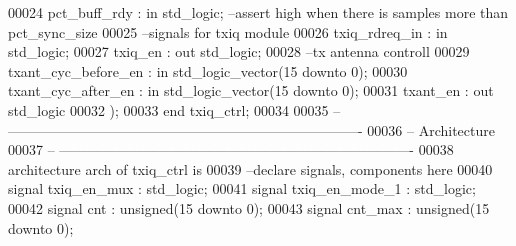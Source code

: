 \begin{DoxyCode}
00024       \textcolor{vhdlchar}{pct_buff_rdy}        \textcolor{vhdlchar}{:} \textcolor{keywordflow}{in} \textcolor{comment}{std\_logic};\textcolor{keyword}{ --assert high when there is samples more than pct\_sync\_size}
00025 \textcolor{keyword}{      --signals for txiq module}
00026       \textcolor{vhdlchar}{txiq_rdreq_in}       \textcolor{vhdlchar}{:} \textcolor{keywordflow}{in} \textcolor{comment}{std\_logic};
00027       \textcolor{vhdlchar}{txiq_en}             \textcolor{vhdlchar}{:} \textcolor{keywordflow}{out} \textcolor{comment}{std\_logic};
00028 \textcolor{keyword}{      --tx antenna controll}
00029       \textcolor{vhdlchar}{txant_cyc_before_en} \textcolor{vhdlchar}{:} \textcolor{keywordflow}{in} \textcolor{comment}{std\_logic\_vector}\textcolor{vhdlchar}{(}\textcolor{vhdllogic}{}\textcolor{vhdllogic}{15} \textcolor{keywordflow}{downto} \textcolor{vhdllogic}{}\textcolor{vhdllogic}{0}\textcolor{vhdlchar}{)};
00030       \textcolor{vhdlchar}{txant_cyc_after_en}  \textcolor{vhdlchar}{:} \textcolor{keywordflow}{in} \textcolor{comment}{std\_logic\_vector}\textcolor{vhdlchar}{(}\textcolor{vhdllogic}{}\textcolor{vhdllogic}{15} \textcolor{keywordflow}{downto} \textcolor{vhdllogic}{}\textcolor{vhdllogic}{0}\textcolor{vhdlchar}{)};
00031       \textcolor{vhdlchar}{txant_en}            \textcolor{vhdlchar}{:} \textcolor{keywordflow}{out} \textcolor{comment}{std\_logic}
00032         \textcolor{vhdlchar}{)};
00033 \textcolor{keywordflow}{end} \textcolor{vhdlchar}{txiq\_ctrl};
00034 
00035 \textcolor{keyword}{-- ----------------------------------------------------------------------------}
00036 \textcolor{keyword}{-- Architecture}
00037 \textcolor{keyword}{-- ----------------------------------------------------------------------------}
00038 \textcolor{keywordflow}{architecture} arch \textcolor{keywordflow}{of} txiq_ctrl is
00039 \textcolor{keyword}{--declare signals,  components here}
00040 \textcolor{keywordflow}{signal} \textcolor{vhdlchar}{txiq_en_mux}         \textcolor{vhdlchar}{:} \textcolor{comment}{std\_logic};
00041 \textcolor{keywordflow}{signal} \textcolor{vhdlchar}{txiq_en_mode_1}      \textcolor{vhdlchar}{:} \textcolor{comment}{std\_logic};
00042 \textcolor{keywordflow}{signal} \textcolor{vhdlchar}{cnt}                 \textcolor{vhdlchar}{:} \textcolor{comment}{unsigned}\textcolor{vhdlchar}{(}\textcolor{vhdllogic}{}\textcolor{vhdllogic}{15} \textcolor{keywordflow}{downto} \textcolor{vhdllogic}{}\textcolor{vhdllogic}{0}\textcolor{vhdlchar}{)};
00043 \textcolor{keywordflow}{signal} \textcolor{vhdlchar}{cnt_max}             \textcolor{vhdlchar}{:} \textcolor{comment}{unsigned}\textcolor{vhdlchar}{(}\textcolor{vhdllogic}{}\textcolor{vhdllogic}{15} \textcolor{keywordflow}{downto} \textcolor{vhdllogic}{}\textcolor{vhdllogic}{0}\textcolor{vhdlchar}{)};

\end{DoxyCode}
